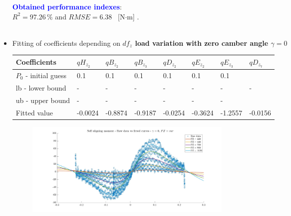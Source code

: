 \documentclass{IEEEtran}
\begin{document}
\begin{itemize}
                \textbf{\textcolor{blue}{Obtained performance indexes}}: \\ $R^{2} = 97.26 \, \%$ and $RMSE = 6.38 $ \, [N$\cdot$m] . \\\\
                
            \item Fitting of coefficients depending on \textbf{\underline{$df_z$} load variation with zero camber angle $\gamma = 0$}
                \begin{table}[htbp]
                    \begin{adjustbox}{width=\columnwidth,center}
                        \begin{tabular}{|l|l|l|l|l|l|l|l|}  
                            \hline
                            Coefficients & $qH_{z_2}$ & $qB_{z_2}$ & $qB_{z_3}$ & $qD_{z_2}$ & $qE_{z_2}$ & $qE_{z_3}$ & $qD_{z_7}$ \\
                            \hline
                            $P_0$ - initial guess & 0.1 & 0.1 & 0.1 & 0.1 & 0.1 & 0.1 &\\ \hline
                            lb - lower bound   & - & - & - & - & - & - & -\\ 
                            \hline
                            ub - upper bound   & - & - & - & - & - & - &\\ 
                            \hline
                            Fitted value & -0.0024 & -0.8874 & -0.9187 & -0.0254 & -0.3624 & -1.2557 & -0.0156 \\
                            \hline
                        \end{tabular}
                    \end{adjustbox}
                \end{table}
            
                \begin{figure}[!h]
                    \centerline{\includegraphics[width = 3.95in]{moment_2.jpg}}
                    

\end{figure}
\end{itemize}
\end{document}
